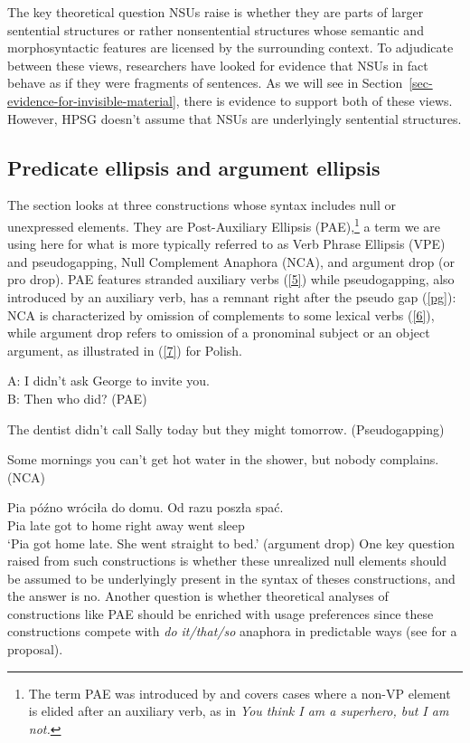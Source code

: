 {The key theoretical question NSUs raise is whether they are parts of larger sentential structures or rather nonsentential structures whose semantic and morphosyntactic features are licensed by the surrounding context. To adjudicate between these views, researchers have looked for evidence that NSUs in fact behave as if they were fragments of sentences. As we will see in Section~\ref{sec-evidence-for-invisible-material}, there is evidence to support both of these views. However, HPSG doesn't assume that NSUs are underlyingly sentential structures.

\subsection{Predicate ellipsis and argument ellipsis}
The section looks at three constructions whose syntax includes null or unexpressed elements. They are Post-Auxiliary Ellipsis (PAE),\footnote{The term PAE was introduced by \citet{Sag1976} and covers cases where a non-VP element is
elided after an auxiliary verb, as in \emph{You think
I am a superhero, but I am not.}} a term we are using here for what is more typically referred to as Verb Phrase Ellipsis (VPE) and pseudogapping, Null Complement Anaphora (NCA), and argument drop (or pro drop). PAE features stranded auxiliary verbs (\ref{5}) while pseudogapping, also introduced by an auxiliary verb,
has a remnant right after the pseudo gap (\ref{pg}):
%
%
%
%
 NCA is characterized by omission of complements to some lexical verbs (\ref{6}), while argument drop refers to omission of a pronominal subject or an object argument, as illustrated in (\ref{7}) for Polish.

\ea A: I didn't ask George to invite you.\\B: Then who did? (PAE) \label{5}\z

\ea The dentist didn't call Sally today but they might tomorrow. (Pseudogapping) \label{pg}\z

\ea Some mornings you can't get hot water in the shower, but nobody complains. (NCA) \label{6} \z

\ea
\gll Pia p\'{o}\'{z}no wr\'{o}ci\l a do domu. Od razu posz\l a spa\'{c}.\\
Pia late got to home right away went sleep\\
\glt `Pia got home late. She went straight to bed.'
(argument drop) \label{7}
\z
%
One key question raised from such constructions
 is whether these unrealized null elements should be assumed to be underlyingly present in the syntax of theses constructions, and the answer is no. Another question is whether theoretical analyses of constructions like PAE should be enriched with usage preferences since these constructions compete with \textit{do it/that/so} anaphora in predictable ways (see \citealt{Miller2011} for a proposal).


}
